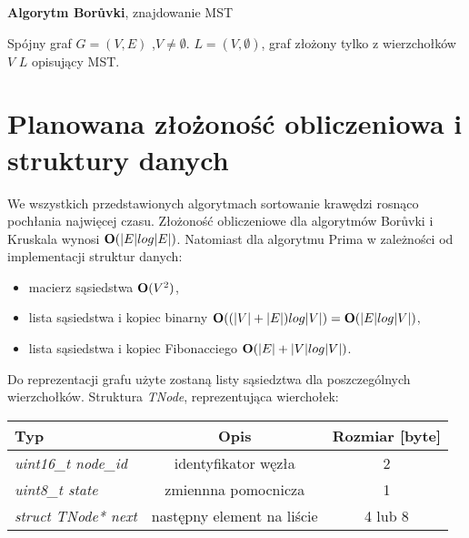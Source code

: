 \documentclass[a4paper, 10pt]{article}
\begin{document}
	
\begin{algorithm}
\caption{{\bf Algorytm Borůvki}, znajdowanie MST}
\begin{algorithmic}[!h]
\REQUIRE Spójny graf $G=(V,E)$ ,$V \neq \emptyset$. 
\ENSURE $L=(V,\emptyset)$, graf złożony tylko z wierzchołków $V$
\STATE {}
\STATE {}
\ENDFOR 
\ENDWHILE
\RETURN $L$ opisujący MST.
\end{algorithmic}
\end{algorithm}



\FloatBarrier

\section{Planowana złożoność obliczeniowa i struktury danych}

We wszystkich przedstawionych algorytmach sortowanie krawędzi rosnąco pochłania 
najwięcej czasu. Złożoność obliczeniowe dla algorytmów Borůvki i Kruskala wynosi
 ${\bf O}(|E| log |E|)$. Natomiast dla algorytmu Prima w zależności od implementacji struktur danych:

\begin{itemize}
\item{macierz sąsiedstwa ${\bf O}(V^2)$,} 
\item{lista sąsiedstwa i kopiec binarny ${\bf O}((|V| + |E|) log |V|) = {\bf O}(|E| log |V|)$,}
\item{lista sąsiedstwa i kopiec Fibonacciego  	${\bf O}(|E| + |V| log |V|)$.} 
\end{itemize}


Do reprezentacji grafu użyte zostaną listy sąsiedztwa dla poszczególnych wierzchołków. Struktura
{\it TNode}, reprezentująca wierchołek:

\begin{tabular}{|l|c|c|}
	\hline 
  {\bf Typ} & {\bf Opis} & {\bf Rozmiar [byte]}\\
  \hline 
  \it{uint16\_t node\_id} & identyfikator węzła & 2 \\
  \hline
  \it{ uint8\_t state} & zmiennna pomocnicza  &  1 \\
  \hline
  \it{ struct TNode* next} & następny element na liście & 4 lub 8 \\
  \hline 
\end{tabular} 
\end{document}
